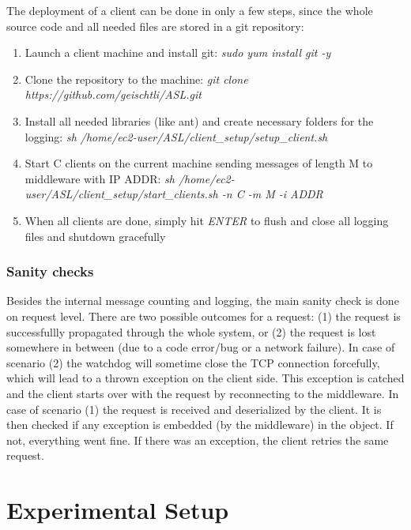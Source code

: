 \documentclass[11pt]{article}
\begin{document}
The deployment of a client can be done in only a few steps, since the whole source code and all needed files are stored in a git repository:
\begin{enumerate}
	\item Launch a client machine and install git: \textit{sudo yum install git -y}
	\item Clone the repository to the machine: \textit{git clone https://github.com/geischtli/ASL.git}
	\item Install all needed libraries (like ant) and create necessary folders for the logging: \newline \textit{sh /home/ec2-user/ASL/client\_setup/setup\_client.sh}
	\item Start C clients on the current machine sending messages of length M to middleware with IP ADDR: \newline\textit{sh /home/ec2-user/ASL/client\_setup/start\_clients.sh -n C -m M -i ADDR}
	\item When all clients are done, simply hit \textit{ENTER} to flush and close all logging files and shutdown gracefully
\end{enumerate}

\subsubsection{Sanity checks}\label{sec:sanity-checks}
Besides the internal message counting and logging, the main sanity check is done on request level. There are two possible outcomes for a request: (1) the request is successfullly propagated through the whole system, or (2) the request is lost somewhere in between (due to a code error/bug or a network failure). In case of scenario (2) the watchdog will sometime close the TCP connection forcefully, which will lead to a thrown exception on the client side. This exception is catched and the client starts over with the request by reconnecting to the middleware. In case of scenario (1) the request is received  and deserialized by the client. It is then checked if any exception is embedded (by the middleware) in the object. If not, everything went fine. If there was an exception, the client retries the same request.

\section{Experimental Setup}\label{sec:experimental-setup}
\end{document}
